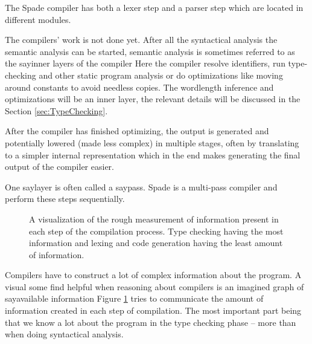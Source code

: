 The Spade compiler has both a lexer step and a parser step which are located in different modules.

The compilers' work is not done yet. After all the syntactical analysis the semantic analysis can be started, semantic analysis is sometimes referred to as the say{inner layers of the compiler} Here the compiler resolve identifiers, run type-checking and other static program analysis or do optimizations like moving around constants to avoid needless copies. The wordlength inference and optimizations will be an inner layer, the relevant details will be discussed in the Section \ref{sec:TypeChecking}. 

After the compiler has finished optimizing, the output is generated and potentially lowered (made less complex) in multiple stages, often by translating to a simpler internal representation which in the end makes generating the final output of the compiler easier.

One say{layer} is often called a say{pass}. Spade is a multi-pass compiler and perform these steps sequentially.
\cite{src:DragonBook, src:CraftingInterp, src:KKLectures}

\begin{figure}[h!]
\begin{center}
  \caption{A visualization of the rough measurement of information present in each step of the compilation process. Type checking having the most information and lexing and code generation having the least amount of information.}
  \label{fig:InformationCompilation}
\end{center}
\end{figure}

Compilers have to construct a lot of complex information about the program. A visual some find helpful when reasoning about compilers is an imagined graph of say{available information} Figure \ref{fig:InformationCompilation} tries to communicate the amount of information created in each step of compilation. The most important part being that we know a lot about the program in the type checking phase -- more than when doing syntactical analysis.

